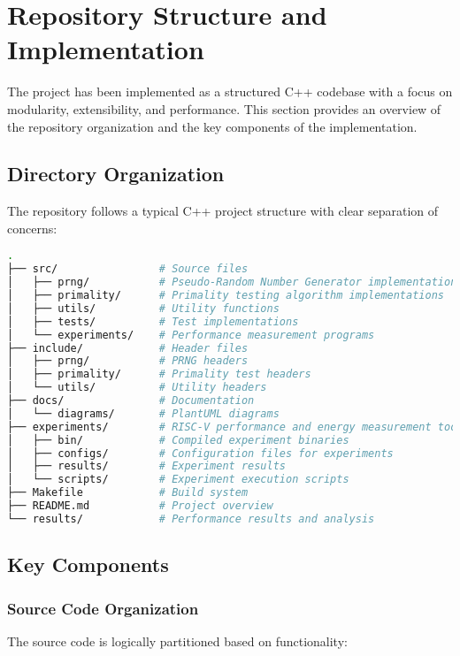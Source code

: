 \section{Repository Structure and Implementation}

The project has been implemented as a structured C++ codebase with a focus on modularity, extensibility, and performance. This section provides an overview of the repository organization and the key components of the implementation.

\subsection{Directory Organization}

The repository follows a typical C++ project structure with clear separation of concerns:

\begin{lstlisting}[language=bash, caption=Project directory structure]
.
├── src/                # Source files
│   ├── prng/           # Pseudo-Random Number Generator implementations
│   ├── primality/      # Primality testing algorithm implementations
│   ├── utils/          # Utility functions
│   ├── tests/          # Test implementations
│   └── experiments/    # Performance measurement programs
├── include/            # Header files
│   ├── prng/           # PRNG headers
│   ├── primality/      # Primality test headers
│   └── utils/          # Utility headers
├── docs/               # Documentation
│   └── diagrams/       # PlantUML diagrams
├── experiments/        # RISC-V performance and energy measurement tools
│   ├── bin/            # Compiled experiment binaries
│   ├── configs/        # Configuration files for experiments
│   ├── results/        # Experiment results
│   └── scripts/        # Experiment execution scripts
├── Makefile            # Build system
├── README.md           # Project overview
└── results/            # Performance results and analysis
\end{lstlisting}

\subsection{Key Components}

\subsubsection{Source Code Organization}

The source code is logically partitioned based on functionality:

